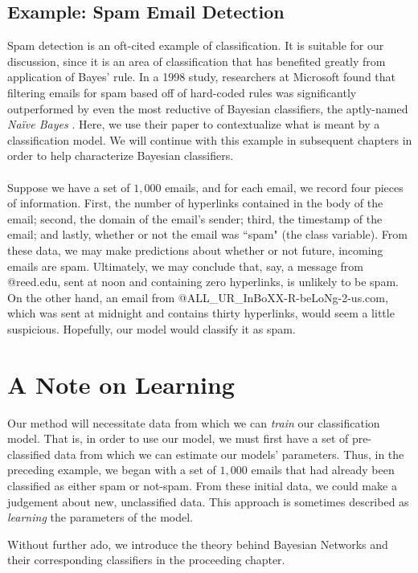\documentclass[12pt,twoside]{reedthesis}
\begin{document}
	\subsection*{Example: Spam Email Detection}
	Spam detection is an oft-cited example of classification. It is suitable for our discussion, since it is an area of classification that has benefited greatly from application of Bayes' rule. In a 1998 study, researchers at Microsoft found that filtering emails for spam based off of hard-coded rules was significantly outperformed by even the most reductive of Bayesian classifiers, the aptly-named {\em Na\"{i}ve Bayes} \cite{msft}. Here, we use their paper to contextualize what is meant by a classification model. We will continue with this example in subsequent chapters in order to help characterize Bayesian classifiers. \\ \\
	
	Suppose we have a set of $1,000$ emails, and for each email, we record four pieces of information. First, the number of hyperlinks contained in the body of the email; second, the domain of the email's sender; third, the timestamp of the email; and lastly, whether or not the email was ``spam" (the class variable). From these data, we may make predictions about whether or not future, incoming emails are spam. Ultimately, we may conclude that, say, a message from @reed.edu, sent at noon and containing zero hyperlinks, is unlikely to be spam. On the other hand, an email from @ALL\_UR\_InBoXX-R-beLoNg-2-us.com, which was sent at midnight and contains thirty hyperlinks, would seem a little suspicious. Hopefully, our model would classify it as spam.
	
\section{A Note on Learning}
	Our method will necessitate data from which we can {\em train} our classification model. That is, in order to use our model, we must first have a set of pre-classified data from which we can estimate our models' parameters. Thus, in the preceding example, we began with a set of $1,000$ emails that had already been classified as either spam or not-spam. From these initial data, we could make a judgement about new, unclassified data. This approach is sometimes described as {\em learning} the parameters of the model.
	
Without further ado, we introduce the theory behind Bayesian Networks and their corresponding classifiers in the proceeding chapter.
\end{document}
